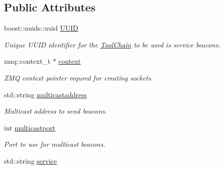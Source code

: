 \subsection*{Public Attributes}
\begin{DoxyCompactItemize}
\item 
\hypertarget{structthread__args_a707586ba05cc2c8be29cf22769b67634}{boost\-::uuids\-::uuid \hyperlink{structthread__args_a707586ba05cc2c8be29cf22769b67634}{U\-U\-I\-D}}\label{structthread__args_a707586ba05cc2c8be29cf22769b67634}

\begin{DoxyCompactList}\small\item\em Unique U\-U\-I\-D identifier for the \hyperlink{classToolChain}{Tool\-Chain} to be used is service beacons. \end{DoxyCompactList}\item 
\hypertarget{structthread__args_a217d01ac4eb4fd9c9ed1ebe4d02ca330}{zmq\-::context\-\_\-t $\ast$ \hyperlink{structthread__args_a217d01ac4eb4fd9c9ed1ebe4d02ca330}{context}}\label{structthread__args_a217d01ac4eb4fd9c9ed1ebe4d02ca330}

\begin{DoxyCompactList}\small\item\em Z\-M\-Q context pointer requred for creating sockets. \end{DoxyCompactList}\item 
\hypertarget{structthread__args_a15f6bcc7a120e51d1074bb8703322ed5}{std\-::string \hyperlink{structthread__args_a15f6bcc7a120e51d1074bb8703322ed5}{multicastaddress}}\label{structthread__args_a15f6bcc7a120e51d1074bb8703322ed5}

\begin{DoxyCompactList}\small\item\em Multicast address to send beacons. \end{DoxyCompactList}\item 
\hypertarget{structthread__args_aa6059ab0eeca3f487491f2542bb5120b}{int \hyperlink{structthread__args_aa6059ab0eeca3f487491f2542bb5120b}{multicastport}}\label{structthread__args_aa6059ab0eeca3f487491f2542bb5120b}

\begin{DoxyCompactList}\small\item\em Port to use for multicast beacons. \end{DoxyCompactList}\item 
\hypertarget{structthread__args_a92798a7f2094db41f45ecbef0c067ca9}{std\-::string \hyperlink{structthread__args_a92798a7f2094db41f45ecbef0c067ca9}{service}}\label{structthread__args_a92798a7f2094db41f45ecbef0c067ca9}


\end{DoxyCompactItemize}
